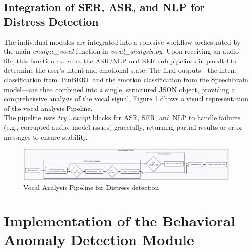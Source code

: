 \documentclass[12pt,a4paper,oneside,english]{book}
\begin{document}
\subsection{Integration of SER, ASR, and NLP for Distress Detection}%
\label{integration_ser_asr_nlp}
The individual modules are integrated into a cohesive workflow orchestrated by the main \textit{analyze\_vocal} function in \textit{vocal\_analysis.py}. Upon receiving an audio file, this function 
executes the ASR/NLP and SER sub-pipelines in parallel to determine the user's intent and emotional state. The final outputs—the intent classification from TunBERT and the emotion classification from 
the SpeechBrain model—are then combined into a single, structured JSON object, providing a comprehensive analysis of the vocal signal, Figure \ref{fig:vocal_pipe} dhows a visual representation of the vocal analysis Pipeline.
\\The pipeline uses \textit{try...except} blocks for ASR, SER, and NLP to handle failures (e.g., corrupted audio, model issues) gracefully, returning partial results or error messages to ensure stability.

\begin{figure}[h!] %
    \centering
    \includegraphics[width=1\textwidth]{images/vocal_analysis_pipeline.png}
    \caption{Vocal Analysis Pipeline for  Distress detection}
    \label{fig:vocal_pipe}
\end{figure}

\section{Implementation of the Behavioral Anomaly Detection Module} %
\end{document}
